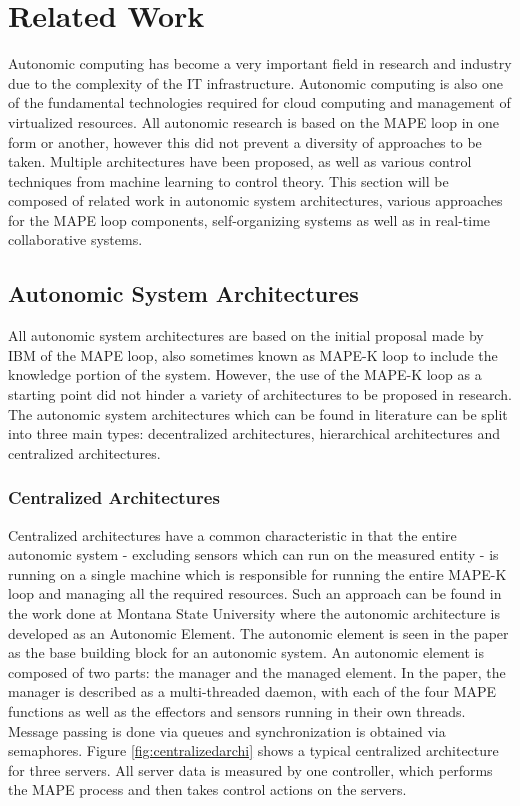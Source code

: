 \section{Related Work}

Autonomic computing has become a very important field in research and industry due to the complexity of the IT infrastructure. Autonomic computing is also one of the fundamental technologies required for cloud computing and management of virtualized resources. All autonomic research is based on the MAPE loop in one form or another, however this did not prevent a diversity of approaches to be taken. Multiple architectures have been proposed, as well as various control techniques from machine learning to control theory. This section will be composed of related work in autonomic system architectures, various approaches for the MAPE loop components, self-organizing systems as well as in real-time collaborative systems.

\subsection{Autonomic System Architectures}

All autonomic system architectures are based on the initial proposal made by IBM of the MAPE loop, also sometimes known as MAPE-K loop to include the knowledge portion of the system. However, the use of the MAPE-K loop as a starting point did not hinder a variety of architectures to be proposed in research. The autonomic system architectures which can be found in literature can be split into three main types: decentralized architectures, hierarchical architectures and centralized architectures.

\subsubsection{Centralized Architectures}

Centralized architectures have a common characteristic in that the entire autonomic system - excluding sensors which can run on the measured entity - is running on a single machine which is responsible for running the entire MAPE-K loop and managing all the required resources. Such an approach can be found in the work done at Montana State University \cite{related:architecture:autonomicelement} where the autonomic architecture is developed as an Autonomic Element. The autonomic element is seen in the paper as the base building block for an autonomic system. An autonomic element is composed of two parts: the manager and the managed element. In the paper, the manager is described as a multi-threaded daemon, with each of the four MAPE functions as well as the effectors and sensors running in their own threads. Message passing is done via queues and synchronization is obtained via semaphores. Figure \ref{fig:centralizedarchi} shows a typical centralized architecture for three servers. All server data is measured by one controller, which performs the MAPE process and then takes control actions on the servers.

